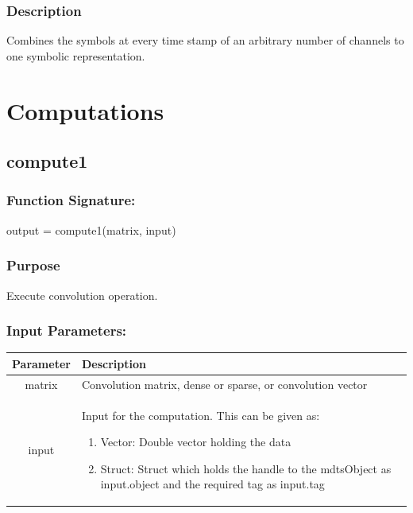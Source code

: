 \documentclass[a4]{scrreprt}
\begin{document}
\subsubsection{Description}

Combines the symbols at every time stamp of an arbitrary number of channels to one symbolic representation.

\section{Computations}

\subsection{compute1}
\label{Chpcompute1Fct}

\subsubsection{Function Signature:}

\begin{center}
	output = compute1(matrix, input)
\end{center}

\subsubsection{Purpose}

Execute convolution operation.

\subsubsection{Input Parameters:}

\begin{longtabu} to \textwidth {|c|X|}
	\hline
	\textbf{Parameter} & \textbf{Description} \\ \hline
	\endhead
	matrix & Convolution matrix, dense or sparse, or convolution vector \\ \hline
	input & Input for the computation. This can be given as:
			\begin{enumerate}
				\item Vector: Double vector holding the data
				\item Struct: Struct which holds the handle to the mdtsObject as input.object and the required tag as input.tag 
			\end{enumerate} \\ \hline
\end{longtabu}
\end{document}
